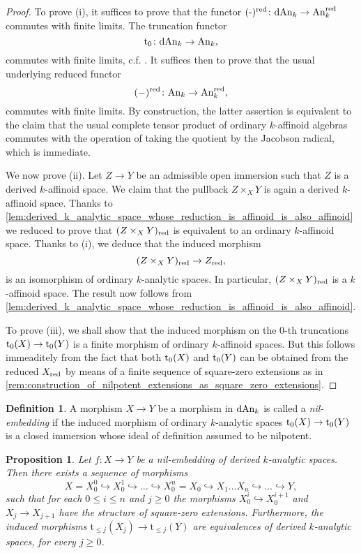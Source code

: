 \documentclass[10pt,a4paper,reqno]{amsart} %
\theoremstyle{plain}
\newtheorem{prop}[thm]{Proposition}
\theoremstyle{definition}
\newtheorem{defin}[thm]{Definition}
\theoremstyle{remark}
\numberwithin{equation}{section}
\begin{document}
\begin{proof} To prove (i), it suffices to prove that
    the functor $(\textrm{-})^{\mathrm{red}} \colon \mathrm{dAn}_k \to \mathrm{An}_k^{\mathrm{red}}$ commutes with finite limits. The truncation functor
        \[
            \mathrm{t}_0 \colon \mathrm{dAn}_k \to \mathrm{An}_k,  
        \]
    commutes with finite limits, c.f. \cite[Proposition 6.2 (v)]{Porta_Yu_Derived_non-archimedean_analytic_spaces}. It suffices then to prove that the usual underlying reduced functor
        \[
            (-)^{\mathrm{red}} \colon \mathrm{An}_k \to \mathrm{An}_k^{\mathrm{red}},
        \]
    commutes with finite limits. By construction,
    the latter assertion is equivalent to the claim that
    the usual complete tensor product of ordinary $k$-affinoid algebras commutes with the operation of taking the quotient by the Jacobson radical, which is immediate.

    We now prove (ii). Let $Z \to Y$ be an admissible open immersion such that $Z$ is a derived $k$-affinoid space. We claim that the pullback
    $Z \times_X Y$ is again a derived $k$-affinoid space. Thanks to \cref{lem:derived_k_analytic_space_whose_reduction_is_affinoid_is_also_affinoid}
    we reduced to prove that $(Z \times_X Y)_{\mathrm{red}}$ is equivalent to an
    ordinary $k$-affinoid space. Thanks to (i), we deduce that the induced morphism
        \[
            (Z \times_X Y)_{\mathrm{red}} \to Z_{\mathrm{red}},  
        \]
    is an isomorphism of ordinary $k$-analytic spaces. In particular, $(Z \times_X Y)_{\mathrm{red}}$ is a $k$-affinoid space. The result now follows from
    \cref{lem:derived_k_analytic_space_whose_reduction_is_affinoid_is_also_affinoid}.

    To prove (iii), we shall show that the induced morphism on the $0$-th truncations $\mathrm{t}_0(X) \to \mathrm{t}_0(Y)$ is a finite morphism of ordinary $k$-affinoid spaces.
    But this follows immeaditely from the fact that both $\mathrm{t}_0(X)$ and $\mathrm{t}_0(Y)$ can be obtained from the reduced $X_{\mathrm{red}}$ by means of a finite sequence of square-zero extensions
    as in \cref{rem:construction_of_nilpotent_extensions_as_square_zero_extensions}.
\end{proof}


\begin{defin}
    A morphism $X \to Y$ be a morphism in $\mathrm{dAn}_k$ is called a \emph{nil-embedding} if the induced morphism of ordinary $k$-analytic spaces
    $\mathrm{t}_0(X) \to \mathrm{t}_0(Y)$ is a closed immersion whose ideal of definition assumed to be nilpotent. 
\end{defin}

\begin{prop} \label{prop:filtered_colimit_for_nil-embeddings}
    Let $f \colon X \to Y$ be a nil-embedding of derived $k$-analytic spaces. Then there exists a sequence of morphisms
        \[X = X_0^0 \hookrightarrow X_0^1 \hookrightarrow \dots \hookrightarrow X_0^n = X_0 
        \hookrightarrow X_1 \dots X_n \hookrightarrow \dots \hookrightarrow Y,\]
    such that for each $0 \le i \le n$ and $j \ge 0$ the morphisms $X_0^i \hookrightarrow X_0^{i+1}$ and $X_j \to X_{j+1}$ have the structure of square-zero extensions.
    Furthermore, the induced morphisms $\mathrm{t}_{\le j}(X_j) \to \mathrm{t}_{\le j}(Y)$ are equivalences of derived
    $k$-analytic spaces, for every $j \ge 0$.
\end{prop}
\end{document}
